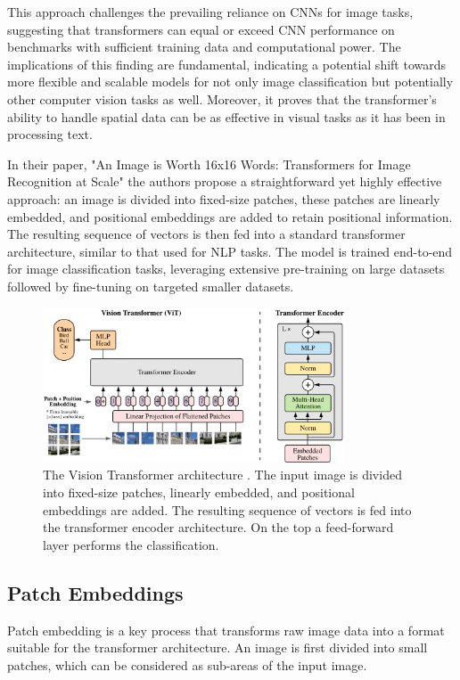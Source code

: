 This approach challenges the prevailing reliance on CNNs for image tasks, 
suggesting that transformers can equal or exceed CNN performance on benchmarks 
with sufficient training data and computational power. The implications of this 
finding are fundamental, indicating a potential shift towards more flexible and 
scalable models for not only image classification but potentially other computer 
vision tasks as well.
Moreover, it proves that the transformer's ability to handle 
spatial data can be as effective in visual tasks as it has been in 
processing text.

In their paper, "An Image is Worth 16x16 Words: Transformers for 
Image Recognition at Scale" \cite{vit} the authors propose a straightforward yet 
highly 
effective approach: an image is divided into fixed-size patches, these patches 
are linearly embedded, and positional embeddings are added to retain positional 
information. The resulting sequence of vectors is then fed into a standard 
transformer architecture, similar to that used for NLP tasks. The model is 
trained end-to-end for image classification tasks, leveraging extensive 
pre-training on large datasets followed by fine-tuning on targeted smaller 
datasets.

\begin{figure}
    \centering
    \includegraphics[width=0.8\textwidth]{images/vit/vit_scheme.png}
    \vspace*{0.3cm}
    \caption[The Vision Transformer architecture.]
    {The Vision Transformer architecture \cite{vit}. The input image is divided 
    into fixed-size patches, linearly embedded, and positional embeddings are 
    added. The resulting sequence of vectors is fed into the transformer encoder 
    architecture. On the top a feed-forward layer performs the classification.}
    \label{fig:vit_architecture}
\end{figure}

\subsection{Patch Embeddings}
Patch embedding is a key process that transforms raw image data into a format 
suitable for the transformer architecture. An image is first divided into small 
patches, which can be considered as sub-areas of the input image. 

